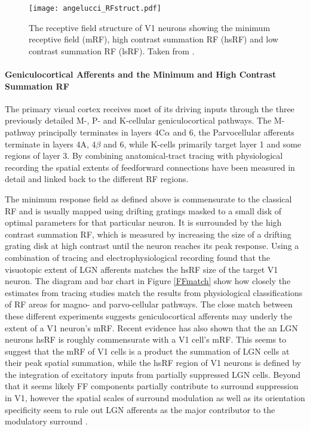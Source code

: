 \begin{figure}
	\centering
        \texttt{[image: angelucci\_RFstruct.pdf]}
	\caption{The receptive field structure of V1 neurons
        showing the minimum receptive field (mRF), high contrast
        summation RF (hsRF) and low contrast summation RF
        (lsRF). Taken from \cite{Angelucci2006}.}
	\label{RFstruct}
\end{figure}

\paragraph{Geniculocortical Afferents and the Minimum and High Contrast Summation RF} \label{AfferentBackground}

The primary visual cortex receives most of its driving inputs through
the three previously detailed M-, P- and K-cellular geniculocortical
pathways. The M-pathway principally terminates in layers 4C$\alpha$
and 6, the Parvocellular afferents terminate in layers 4A, 4$\beta$
and 6, while K-cells primarily target layer 1 and some regions of
layer 3. By combining anatomical-tract tracing with physiological
recording the spatial extents of feedforward connections have been
measured in detail and linked back to the different RF regions.

The minimum response field as defined above is commensurate to the
classical RF and is usually mapped using drifting gratings masked to a
small disk of optimal parameters for that particular neuron. It is
surrounded by the high contrast summation RF, which is measured by
increasing the size of a drifting grating disk at high contrast until
the neuron reaches its peak response. Using a combination of tracing
and electrophysiological recording \citep{Angelucci2006a} found that
the visuotopic extent of LGN afferents matches the hsRF size of the
target V1 neuron. The diagram and bar chart in Figure \ref{FFmatch}
show how closely the estimates from tracing studies match the results
from physiological classifications of RF areas for magno- and
parvo-cellular pathways. The close match between these different
experiments suggests geniculocortical afferents may underly the extent
of a V1 neuron's mRF. Recent evidence has also shown that the an LGN
neurons hsRF is roughly commensurate with a V1 cell's mRF. This seems
to suggest that the mRF of V1 cells is a product the summation of LGN
cells at their peak spatial summation, while the hsRF region of V1
neurons is defined by the integration of excitatory inputs from
partially suppressed LGN cells. Beyond that it seems likely FF
components partially contribute to surround suppression in V1, however
the spatial scales of surround modulation as well as its orientation
specificity seem to rule out LGN afferents as the major contributor to
the modulatory surround \citep{Angelucci2002,Angelucci2006a}.


